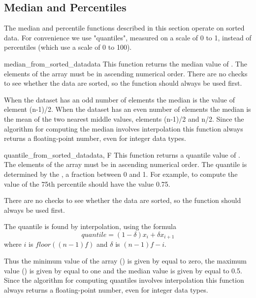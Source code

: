 \subsection{Median and Percentiles}
\label{sec:stat:median-percentiles}

The median and percentile functions described in this section operate on sorted
data.  For convenience we use "quantiles", measured on a scale of 0 to 1,
instead of percentiles (which use a scale of 0 to 100).

\begin{funcdesc}{median_from_sorted_data}{data}
   This function returns the median value of .  The elements of the
   array must be in ascending numerical order.  There are no checks to see
   whether the data are sorted, so the function  should always
   be used first.
   
   When the dataset has an odd number of elements the median is the value of
   element (n-1)/2.  When the dataset has an even number of elements the median
   is the mean of the two nearest middle values, elements (n-1)/2 and n/2.
   Since the algorithm for computing the median involves interpolation this
   function always returns a floating-point number, even for integer data
   types.
\end{funcdesc}

\begin{funcdesc}{quantile_from_sorted_data}{data, F}
   This function returns a quantile value of .  The elements of the
   array must be in ascending numerical order.  The quantile is determined by
   the , a fraction between 0 and 1.  For example, to compute the value
   of the 75th percentile  should have the value 0.75.
   
   There are no checks to see whether the data are sorted, so the function
    should always be used first.
   
   The quantile is found by interpolation, using the formula
   \begin{equation}
      quantile = (1 - \delta) x_i + \delta x_{i+1}
   \end{equation}
   where $i$ is $floor((n - 1)f)$ and $\delta$ is $(n-1)f - i$.
   
   Thus the minimum value of the array () is given by 
   equal to zero, the maximum value () is given by  equal
   to one and the median value is given by  equal to 0.5.  Since the
   algorithm for computing quantiles involves interpolation this function
   always returns a floating-point number, even for integer data types.
\end{funcdesc}


